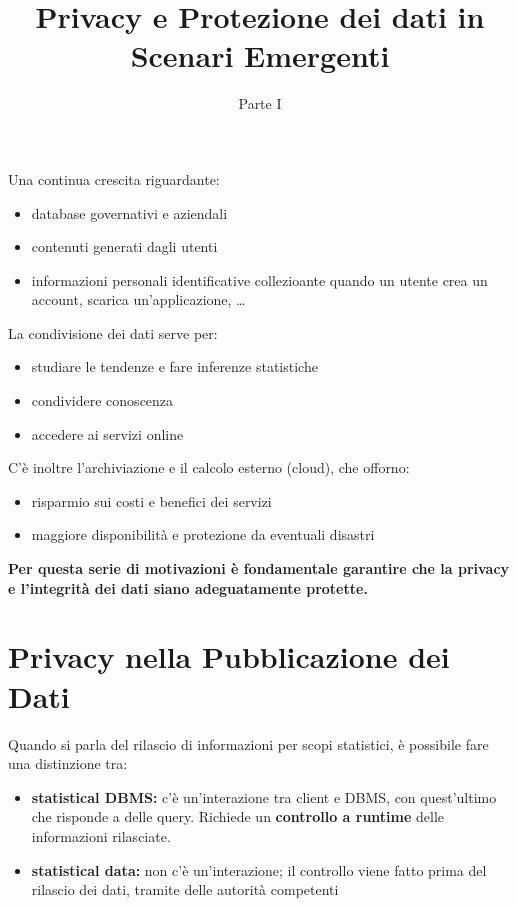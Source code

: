\documentclass{report}
\title{Privacy e Protezione dei dati in Scenari Emergenti}
\date{Parte I}
\begin{document}
\maketitle

\tableofcontents

\newpage
Una continua crescita riguardante:
\begin{itemize}
    \item database governativi e aziendali
    \item contenuti generati dagli utenti 
    \item informazioni personali identificative collezioante quando un utente crea un account, scarica un'applicazione, \dots
\end{itemize}
La condivisione dei dati serve per:
\begin{itemize}
    \item studiare le tendenze e fare inferenze statistiche
    \item condividere conoscenza
    \item accedere ai servizi online
\end{itemize}
C'è inoltre l'archiviazione e il calcolo esterno (cloud), che offorno:
\begin{itemize}
    \item risparmio sui costi e benefici dei servizi
    \item maggiore disponibilità e protezione da eventuali disastri
\end{itemize}

\textbf{Per questa serie di motivazioni è fondamentale garantire che la privacy e l’integrità dei dati siano
adeguatamente protette.}

\chapter{Privacy nella Pubblicazione dei Dati}

Quando si parla del rilascio di informazioni per scopi statistici,
è possibile fare una distinzione tra:
\begin{itemize}
    \item \textbf{statistical DBMS:} c'è un'interazione tra client e DBMS, con quest'ultimo che risponde a delle query. Richiede un \textbf{controllo a runtime} delle informazioni rilasciate.
    \item \textbf{statistical data:} non c'è un'interazione; il controllo viene fatto prima del rilascio dei dati, tramite delle autorità competenti
\end{itemize}
\end{document}
